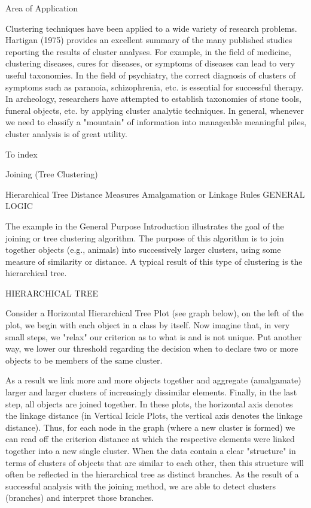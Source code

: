 Area of Application

Clustering techniques have been applied to a wide variety of research problems. Hartigan (1975) provides an excellent summary of the many published studies reporting the results of cluster analyses. For example, in the field of medicine, clustering diseases, cures for diseases, or symptoms of diseases can lead to very useful taxonomies. In the field of psychiatry, the correct diagnosis of clusters of symptoms such as paranoia, schizophrenia, etc. is essential for successful therapy. In archeology, researchers have attempted to establish taxonomies of stone tools, funeral objects, etc. by applying cluster analytic techniques. In general, whenever we need to classify a "mountain" of information into manageable meaningful piles, cluster analysis is of great utility.

To index

 
Joining (Tree Clustering)

Hierarchical Tree
Distance Measures
Amalgamation or Linkage Rules
GENERAL LOGIC

The example in the General Purpose Introduction illustrates the goal of the joining or tree clustering algorithm. The purpose of this algorithm is to join together objects (e.g., animals) into successively larger clusters, using some measure of similarity or distance. A typical result of this type of clustering is the hierarchical tree.

HIERARCHICAL TREE

Consider a Horizontal Hierarchical Tree Plot (see graph below), on the left of the plot, we begin with each object in a class by itself. Now imagine that, in very small steps, we "relax" our criterion as to what is and is not unique. Put another way, we lower our threshold regarding the decision when to declare two or more objects to be members of the same cluster.



As a result we link more and more objects together and aggregate (amalgamate) larger and larger clusters of increasingly dissimilar elements. Finally, in the last step, all objects are joined together. In these plots, the horizontal axis denotes the linkage distance (in Vertical Icicle Plots, the vertical axis denotes the linkage distance). Thus, for each node in the graph (where a new cluster is formed) we can read off the criterion distance at which the respective elements were linked together into a new single cluster. When the data contain a clear "structure" in terms of clusters of objects that are similar to each other, then this structure will often be reflected in the hierarchical tree as distinct branches. As the result of a successful analysis with the joining method, we are able to detect clusters (branches) and interpret those branches.


